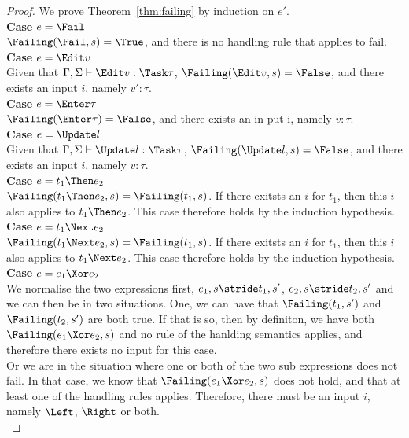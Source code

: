 \begin{proof}

  We prove Theorem~\ref{thm:failing} by induction on $e'$.\\

  \noindent\textbf{Case} $e = \Fail$\\
  $\Failing(\Fail,s)=\True$, and there is no handling rule that applies to fail.\\

  \noindent\textbf{Case} $e = \Edit v$\\
   Given that $\Gamma,\Sigma\infers\Edit v:\Task\tau$, $\Failing(\Edit v,s)=\False$, and there exists an input $i$, namely $v':\tau$.\\

  \noindent\textbf{Case} $e = \Enter \tau$\\
  $\Failing(\Enter \tau)=\False$, and there exists an in put i, namely $v:\tau$.\\

  \noindent\textbf{Case} $e = \Update l$\\
  Given that $\Gamma,\Sigma\infers\Update l:\Task\tau$, $\Failing(\Update l,s)=\False$, and there exists an input $i$, namely $v:\tau$.\\

  \noindent\textbf{Case} $e = t_1\Then e_2$\\
   $\Failing(t_1\Then e_2,s)=\Failing(t_1,s)$. If there exitsts an $i$ for $t_1$, then this $i$ also applies to $t_1\Then e_2$. This case therefore holds by the induction hypothesis.\\

  \noindent\textbf{Case} $e = t_1\Next e_2$\\
   $\Failing(t_1\Next e_2,s)=\Failing(t_1,s)$. If there exitsts an $i$ for $t_1$, then this $i$ also applies to $t_1\Next e_2$. This case therefore holds by the induction hypothesis.\\

  \noindent\textbf{Case} $e = e_1\Xor e_2$\\
   We normalise the two expressions first, $e_1,s\stride t_1,s'$, $e_2,s\stride t_2,s'$ and we can then be in two situations. One, we can have that $\Failing(t_1,s')$ and $\Failing(t_2,s')$ are both true. If that is so, then by definiton, we have both $\Failing(e_1\Xor e_2,s)$ and no rule of the hanlding semantics applies, and therefore there exists no input for this case.\\
                                           Or we are in the situation where one or both of the two sub expressions does not fail. In that case, we know that $\Failing(e_1\Xor e_2,s)$ does not hold, and that at least one of the handling rules applies. Therefore, there must be an input $i$, namely $\Left$, $\Right$ or both.\\


\end{proof}
